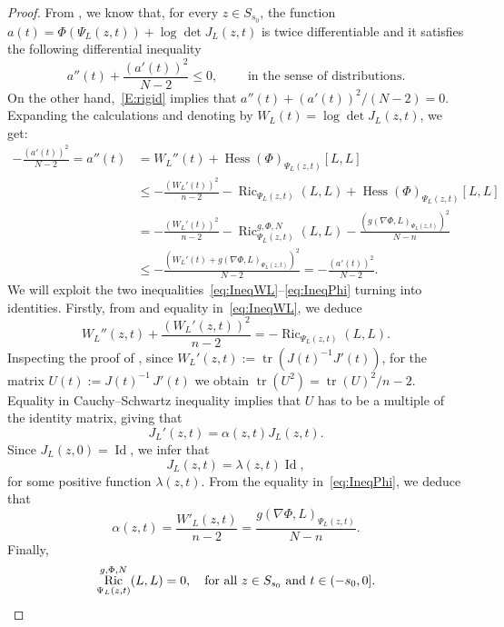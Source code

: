 \documentclass[12pt,a4paper]{amsart}
\theoremstyle{plain}
\theoremstyle{definition}
\numberwithin{equation}{section}
\DeclareMathOperator{\Hess}{Hess}
\DeclareMathOperator{\Ric}{Ric}
\DeclareMathOperator{\id}{Id}
\DeclareMathOperator{\tr}{tr}
\newcommand{\gflow}{\Psi}
\begin{document}
\begin{proof}
\noindent
From , we know that,
for every $z\in S_{s_0}$, the function $a(t)=\Phi(\gflow_L(z,t))+\log \det J_{L}(z,t)$ is twice differentiable and it satisfies the
  following differential inequality
  $$
    a''(t)
    +\frac{(a'(t))^2}{N-2}
    \leq
    0
    ,
    \qquad
    \text{ in the sense of distributions.}
  $$
On the other hand,~\eqref{E:rigid} implies that 
$ a''(t)+ (a'(t))^2/(N-2) = 0$.
Expanding the calculations and denoting by 
$W_L(t) = \log \det J_{L}(z,t)$, we get: 
%
\begin{align}
    -\frac{(a'(t))^2}{N-2} = a''(t)
    &
      =
    W_{L}''(t)
    +
      \Hess(\Phi)_{\gflow_L(z,t)}[L,L] \nonumber \\     
      & \leq
     - \frac{(W_{L}'(t))^2}{n-2}
      -
      \Ric_{\gflow_L(z,t)}(L,L)
      +
      \Hess(\Phi)_{\gflow_L(z,t)}[L,L] \label{eq:IneqWL}
    \\
    &
      =
      -\frac{(W_{L}'(t))^2}{n-2}
      -
      \Ric^{g,\Phi,N}_{\gflow_L(z,t)}(L,L)
      -
      \frac{(g(\nabla \Phi,L)_{\gflow_L(z,t)})^2}{N-n} \nonumber
    \\
    &
      \leq
      - \frac{(W_{L}'(t)
      +g(\nabla \Phi ,L)_{\gflow_L(z,t)})^2}{N-2}      
      =
     - \frac{(a'(t))^2}{N-2}. \label{eq:IneqPhi}
\end{align}
%
We will exploit the two inequalities~\eqref{eq:IneqWL}--\eqref{eq:IneqPhi} turning into identities. 
Firstly, from  and equality in~\eqref{eq:IneqWL},  we deduce 
$$
    W_{L}''(z,t)
    +\frac{(W_{L}'(z,t))^2}{n-2}
=
   - \Ric_{\gflow_L(z,t)}(L,L). 
$$
Inspecting the proof of , since $W_{L}'(z,t):= \tr(J(t)^{-1} J'(t))$,
for the matrix $U(t):=J(t)^{-1}\, J'(t)$ we obtain
%
$\tr(U^2) = \tr(U)^2/n-2$.
%
Equality in Cauchy--Schwartz inequality implies that $U$ has to be a
multiple of the identity matrix, giving that 
\begin{equation}\label{eq:J'alphaJ}
J_{L}'(z,t) = \alpha(z,t) J_L(z,t).
\end{equation}
Since  $J_L(z,0) = \id$, we infer that
\begin{equation}\label{eq:JLlambda}
J_L(z,t) = \lambda(z,t) \id,
\end{equation}
for some positive function $\lambda(z,t)$.
From the equality in~\eqref{eq:IneqPhi}, we deduce that 
%
\begin{equation}\label{eq:alphaW'nablaPhi}
\alpha(z,t)= \frac{W'_L(z,t)}{n-2} = \frac{g(\nabla \Phi, L)_{\gflow_L(z,t)}}{N-n}.
\end{equation}   
%
Finally,
\begin{equation}\label{eq:Ric=0}
\Ric^{g,\Phi,N}_{\gflow_L(z,t)}(L,L) = 0,  \quad \text{for all $z \in S_{s_0}$ and $ t \in (-s_0,0]$}.
\end{equation}


\end{proof}
\end{document}
